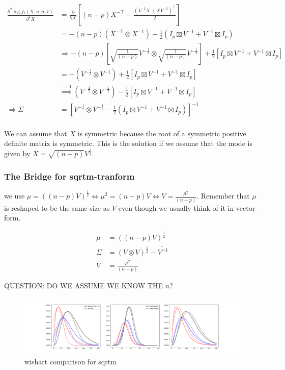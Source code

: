 \begin{align*}
\frac{\partial^2 \log f_t(X; n,p,V)}{\partial^2 X} &= \frac{\partial}{\partial X} \left[(n-p)X^{-\top} - \frac{(V^{-1}X + XV^{-1})^\top}{2}\right] \\
&= -(n-p) (X^{-\top} \otimes X^{-1}) + \frac{1}{2}(I_p \boxtimes V^{-1} + V^{-1} \boxtimes I_p) \\
&\Rightarrow -(n-p) \left[\sqrt{\frac{1}{(n-p)}}V^{-\frac{1}{2}} \otimes \sqrt{\frac{1}{(n-p)}}V^{-\frac{1}{2}}\right] + \frac{1}{2}\left[I_p \boxtimes V^{-1} + V^{-1} \boxtimes I_p\right] \\
&= - \left(V^{-\frac{1}{2}} \otimes V^{-1}\right) + \frac{1}{2}\left[I_p \boxtimes V^{-1} + V^{-1} \boxtimes I_p\right] \\
&\overset{\cdot -1}{\Rightarrow} \left(V^{-\frac{1}{2}} \otimes V^{-\frac{1}{2}}\right) - \frac{1}{2}\left[I_p \boxtimes V^{-1} + V^{-1} \boxtimes I_p\right] \\
\Rightarrow \Sigma &= \left[V^{-\frac{1}{2}} \otimes V^{-\frac{1}{2}} - \frac{1}{2}\left(I_p \boxtimes V^{-1} + V^{-1} \boxtimes I_p\right)\right]^{-1} \\
\end{align*}

We can assume that $X$ is symmetric because the root of a symmetric positive definite matrix is symmetric. 
This is the solution if we assume that the mode is given by $X = \sqrt{(n-p)}V^{\frac{1}{2}}$. 

\subsubsection{The Bridge for sqrtm-tranform}

we use $\mu =  ((n-p)V)^{\frac{1}{2}} \Leftrightarrow \mu^2 = (n-p)V \Leftrightarrow V = \frac{\mu^2}{(n-p)}$. Remember that $\mu$ is reshaped to be the same size as $V$ even though we usually think of it in vector-form. 

\begin{align}
	\mu &=  ((n-p)V)^{\frac{1}{2}} \\
	\Sigma &= (V \otimes V)^{\frac{1}{2}} - \tilde{V^{-1}} \\
	V &= \frac{\mu^2}{(n-p)}
\end{align}

QUESTION: DO WE ASSUME WE KNOW THE $n$? 

\begin{figure}[!htb]
	\centering
	\includegraphics[width=\textwidth]{figures/wishart_playground_sqrtm.pdf}
	\caption{wishart comparison for sqrtm}
	\label{fig:wishart_comparison}
\end{figure}


